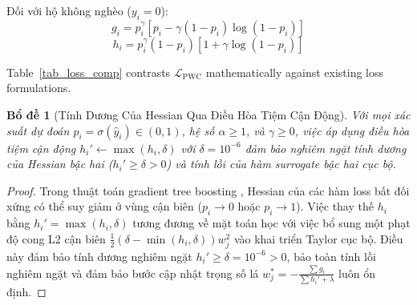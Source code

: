 \documentclass[conference]{IEEEtran}
\begin{document}
Đối với hộ không nghèo ($y_i = 0$):
\begin{equation}
g_i = p_i^\gamma \left[ p_i - \gamma (1 - p_i) \log(1 - p_i) \right]
\end{equation}
\begin{equation}
h_i = p_i^\gamma (1 - p_i) \left[ 1 + \gamma \log(1 - p_i) \right]
\end{equation}

Table~\ref{tab_loss_comp} contrasts $\mathcal{L}_{\text{PWC}}$ mathematically against existing loss formulations.

\begin{table}[htbp]
\caption{Mathematical Comparison of Loss Objectives}
\begin{center}
\label{tab_loss_comp}
\end{center}
\end{table}

\newtheorem{lemma}{Bổ đề}
\newtheorem{theorem}{Định lý}

\begin{lemma}[Tính Dương Của Hessian Qua Điều Hòa Tiệm Cận Động]
Với mọi xác suất dự đoán $p_i = \sigma(\hat{y}_i) \in (0, 1)$, hệ số $\alpha \ge 1$, và $\gamma \ge 0$, việc áp dụng điều hòa tiệm cận động $h_i' \leftarrow \max(h_i, \delta)$ với $\delta = 10^{-6}$ đảm bảo nghiêm ngặt tính dương của Hessian bậc hai ($h_i' \ge \delta > 0$) và tính lồi của hàm surrogate bậc hai cục bộ.
\end{lemma}
\begin{proof}
Trong thuật toán gradient tree boosting \cite{b20}, Hessian của các hàm loss bất đối xứng có thể suy giảm ở vùng cận biên ($p_i \to 0$ hoặc $p_i \to 1$). Việc thay thế $h_i$ bằng $h_i' = \max(h_i, \delta)$ tương đương về mặt toán học với việc bổ sung một phạt độ cong L2 cận biên $\frac{1}{2}(\delta - \min(h_i, \delta)) w_j^2$ vào khai triển Taylor cục bộ. Điều này đảm bảo tính dương nghiêm ngặt $h_i' \ge \delta = 10^{-6} > 0$, bảo toàn tính lồi nghiêm ngặt và đảm bảo bước cập nhật trọng số lá $w_j^* = -\frac{\sum g_i}{\sum h_i' + \lambda}$ luôn ổn định.
\end{proof}
\end{document}
